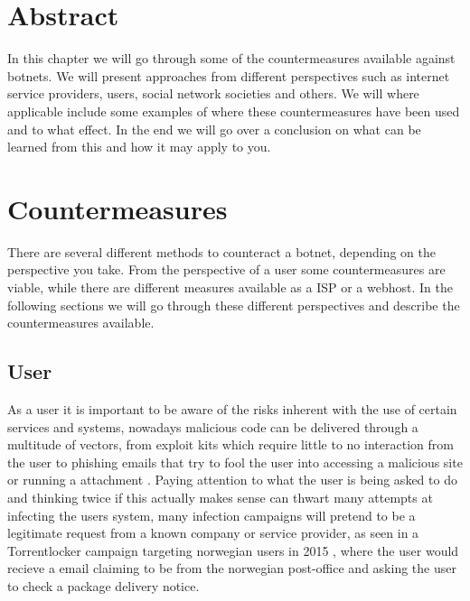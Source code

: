 \section{Abstract}
In this chapter we will go through some of the countermeasures available against botnets.
We will present approaches from different perspectives such as internet service providers, users, social network societies and others. We will where applicable include some examples of where these countermeasures have been used and to what effect.
In the end we will go over a conclusion on what can be learned from this and how it may apply to you.






\section{Countermeasures}
There are several different methods to counteract a botnet, depending on the perspective you take.
From the perspective of a user some countermeasures are viable, while there are different measures available as a ISP or a webhost.
In the following sections we will go through these different perspectives and describe the countermeasures available.

\subsection{User}
As a user it is important to be aware of the risks inherent with the use of certain services and systems, nowadays malicious code can be delivered through a multitude of vectors, from exploit kits which require little to no interaction from the user to phishing emails that try to fool the user into accessing a malicious site or running a attachment \cite{jan-brewer}. 
Paying attention to what the user is being asked to do and thinking twice if this actually makes sense can thwart many attempts at infecting the users system, many infection campaigns will pretend to be a legitimate request from a known company or service provider, as seen in a Torrentlocker campaign targeting norwegian users in 2015 \cite{jan-nsm-ransomware}, where the user would recieve a email claiming to be from the norwegian post-office and asking the user to check a package delivery notice. 

